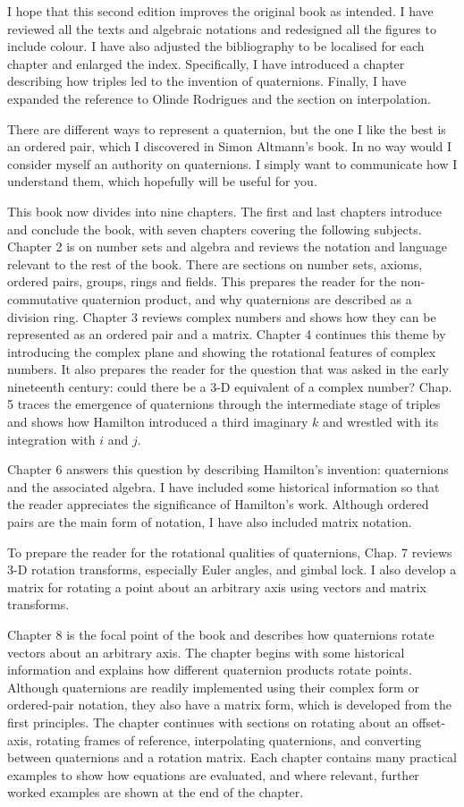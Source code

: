 \documentclass[10pt]{article}
\begin{document}
I hope that this second edition improves the original book as intended. I have reviewed all the texts and algebraic notations and redesigned all the figures to include colour. I have also adjusted the bibliography to be localised for each chapter and enlarged the index. Specifically, I have introduced a chapter describing how triples led to the invention of quaternions. Finally, I have expanded the reference to Olinde Rodrigues and the section on interpolation.

There are different ways to represent a quaternion, but the one I like the best is an ordered pair, which I discovered in Simon Altmann's book. In no way would I consider myself an authority on quaternions. I simply want to communicate how I understand them, which hopefully will be useful for you.

This book now divides into nine chapters. The first and last chapters introduce and conclude the book, with seven chapters covering the following subjects. Chapter 2 is on number sets and algebra and reviews the notation and language relevant to the rest of the book. There are sections on number sets, axioms, ordered pairs, groups, rings and fields. This prepares the reader for the non-commutative quaternion product, and why quaternions are described as a division ring. Chapter 3 reviews complex numbers and shows how they can be represented as an ordered pair and a matrix. Chapter 4 continues this theme by introducing the complex plane and showing the rotational features of complex numbers. It also prepares the reader for the question that was asked in the early nineteenth century: could there be a 3-D equivalent of a complex number? Chap. 5 traces the emergence of quaternions through the intermediate stage of triples and shows how Hamilton introduced a third imaginary $k$ and wrestled with its integration with $i$ and $j$.

Chapter 6 answers this question by describing Hamilton's invention: quaternions and the associated algebra. I have included some historical information so that the reader appreciates the significance of Hamilton's work. Although ordered pairs are the main form of notation, I have also included matrix notation.

To prepare the reader for the rotational qualities of quaternions, Chap. 7 reviews 3-D rotation transforms, especially Euler angles, and gimbal lock. I also develop a matrix for rotating a point about an arbitrary axis using vectors and matrix transforms.

Chapter 8 is the focal point of the book and describes how quaternions rotate vectors about an arbitrary axis. The chapter begins with some historical information and explains how different quaternion products rotate points. Although quaternions are readily implemented using their complex form or ordered-pair notation, they also have a matrix form, which is developed from the first principles. The chapter continues with sections on rotating about an offset-axis, rotating frames of reference, interpolating quaternions, and converting between quaternions and a rotation matrix. Each chapter contains many practical examples to show how equations are evaluated, and where relevant, further worked examples are shown at the end of the chapter.
\end{document}
